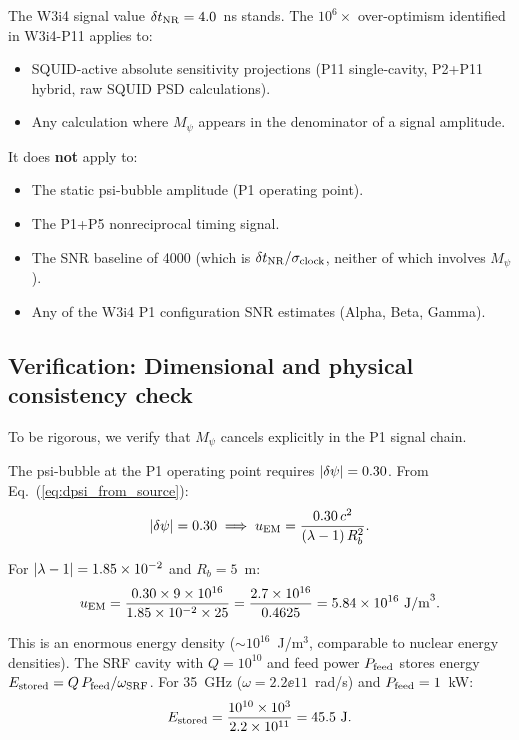 \begin{tcolorbox}[colback=green!5!white, colframe=green!50!black,
  title=\textbf{Result: The 4.0 ns Signal Is Unaffected by the M$_\psi$ Correction}]
The W3i4 signal value $\delta t_{\rm NR} = 4.0$~ns stands. The $10^6\times$
over-optimism identified in W3i4-P11 applies to:
\begin{itemize}[nosep]
\item SQUID-active absolute sensitivity projections (P11 single-cavity,
  P2+P11 hybrid, raw SQUID PSD calculations).
\item Any calculation where $M_\psi$ appears in the denominator of a
  signal amplitude.
\end{itemize}
It does \textbf{not} apply to:
\begin{itemize}[nosep]
\item The static psi-bubble amplitude (P1 operating point).
\item The P1+P5 nonreciprocal timing signal.
\item The SNR baseline of 4000 (which is $\delta t_{\rm NR}/\sigma_{\rm clock}$,
  neither of which involves $M_\psi$).
\item Any of the W3i4 P1 configuration SNR estimates (Alpha, Beta, Gamma).
\end{itemize}
\end{tcolorbox}

\subsection{Verification: Dimensional and physical consistency check}
\label{ssec:verification}

To be rigorous, we verify that $M_\psi$ cancels explicitly in the P1 signal
chain.

The psi-bubble at the P1 operating point requires $|\delta\psi| = 0.30$. From
Eq.~(\ref{eq:dpsi_from_source}):
\begin{equation}
|\delta\psi| = 0.30 \implies u_{\rm EM} = \frac{0.30\,c^2}{(\lambda-1)\,R_b^2}.
\label{eq:uEM_required}
\end{equation}

For $|\lambda - 1| = 1.85\times 10^{-2}$ and $R_b = 5$~m:
\begin{equation}
u_{\rm EM} = \frac{0.30 \times 9\times 10^{16}}{1.85\times 10^{-2} \times 25}
= \frac{2.7\times 10^{16}}{0.4625} = 5.84\times 10^{16}~\text{J/m}^3.
\label{eq:uEM_numerical}
\end{equation}

This is an enormous energy density ($\sim 10^{16}$~J/m$^3$, comparable to
nuclear energy densities). The SRF cavity with $Q = 10^{10}$ and feed power
$P_{\rm feed}$ stores energy $E_{\rm stored} = Q\,P_{\rm feed}/\omega_{\rm SRF}$.
For 35~GHz ($\omega = 2.2\ee{11}$~rad/s) and $P_{\rm feed} = 1$~kW:
\begin{equation}
E_{\rm stored} = \frac{10^{10} \times 10^3}{2.2\times 10^{11}} = 45.5~\text{J}.
\label{eq:E_stored}
\end{equation}


